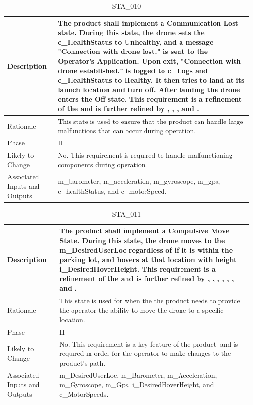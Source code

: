 \documentclass{article}
\begin{document}
\begin{table}[!h]
\begin{center}
\caption {STA\_010} 
\label{STA_010}
\begin{tabular}{ | m{3cm} | m{11cm} | }
\hline
Description & The product shall implement a Communication Lost state. During this state, the drone sets the c\_HealthStatus to Unhealthy, and a message "Connection with drone lost." is sent to the Operator's Application. Upon exit, "Connection with drone established." is logged to c\_Logs and c\_HealthStatus to Healthy. It then tries to land at its launch location and turn off. After landing the drone enters the Off state. This requirement is a refinement of the \nameref{Communication Lost State} and is further refined by \nameref{PERF_007}, \nameref{SAFE_001}, \nameref{SAFE_003}, and \nameref{USE_003}. \\
\hline
Rationale & This state is used to ensure that the product can handle large malfunctions that can occur during operation. \\
\hline
Phase & II \\
\hline
Likely to Change & No. This requirement is required to handle malfunctioning components during operation. \\
\hline
Associated Inputs and Outputs & m\_barometer, m\_acceleration, m\_gyroscope, m\_gps, c\_healthStatus, and c\_motorSpeed. \\
\hline
\end{tabular}
\end{center}
\end{table}
\clearpage
\newpage

\begin{table}[!h]
\begin{center}
\caption {STA\_011} 
\label{STA_011}
\begin{tabular}{ | m{3cm} | m{11cm} | }
\hline
Description & The product shall implement a Compulsive Move State. During this state, the drone moves to the m\_DesiredUserLoc regardless of if it is within the parking lot, and hovers at that location with height i\_DesiredHoverHeight. This requirement is a refinement of the \nameref{Compulsive Move State} and is further refined by \nameref{PERF_003}, \nameref{PERF_004}, \nameref{PERF_006}, \nameref{PERF_007}, \nameref{SAFE_001}, \nameref{SAFE_003}, \nameref{PERF_008} and \nameref{USE_003}. \\
\hline
Rationale & This state is used for when the the product needs to provide the operator the ability to move the drone to a specific location. \\
\hline
Phase & II \\
\hline
Likely to Change & No. This requirement is a key feature of the product, and is required in order for the operator to make changes to the product's path. \\
\hline
Associated Inputs and Outputs & m\_DesiredUserLoc, m\_Barometer, m\_Acceleration, m\_Gyroscope, m\_Gps, i\_DesiredHoverHeight, and c\_MotorSpeeds. \\
\hline
\end{tabular}
\end{center}
\end{table}
\end{document}
